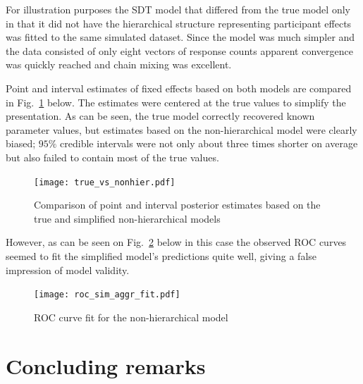 \documentclass[oneside,a4paper]{article}
\begin{document}
For illustration purposes the SDT model that differed from the true
model only in that it did not have the hierarchical structure
representing participant effects was fitted to the same simulated
dataset. Since the model was much simpler and the data consisted of
only eight vectors of response counts apparent convergence was quickly
reached and chain mixing was excellent.

Point and interval estimates of fixed effects based on both models are
compared in Fig.~\ref{fig:5} below. The estimates were centered at the
true values to simplify the presentation. As can be seen, the true
model correctly recovered known parameter values, but estimates based
on the non-hierarchical model were clearly biased; $95\%$ credible
intervals were not only about three times shorter on average but also
failed to contain most of the true values.

\begin{figure}[H]
  \centering
  \texttt{[image: true\_vs\_nonhier.pdf]}
  \caption{Comparison of point and interval posterior estimates based
    on the true and simplified non-hierarchical models}
  \label{fig:5}
\end{figure}

However, as can be seen on Fig.~\ref{fig:8} below in this case the
observed ROC curves seemed to fit the simplified model's predictions
quite well, giving a false impression of model validity.

\begin{figure}[H]
  \centering
  \texttt{[image: roc\_sim\_aggr\_fit.pdf]}
  \caption{ROC curve fit for the non-hierarchical model}
  \label{fig:8}
\end{figure}

\section{Concluding remarks}
\end{document}
